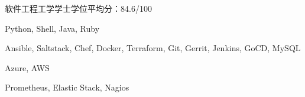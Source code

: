 \documentclass{resume}
\begin{document}
\begin{body}

	\smallskip
	{软件工程工学学士学位}{平均分：84.6/100}
\end{body}

\smallskip


\begin{body}
\begin{description}[style=nextline,leftmargin=8em,topsep=1pt]
	\item[语言] Python, Shell, Java, Ruby
	\item[工具] Ansible, Saltstack, Chef, Docker, Terraform, Git, Gerrit, Jenkins, GoCD, MySQL
	\item[云服务] Azure, AWS
	\item[监控] Prometheus, Elastic Stack, Nagios
\end{description}
\end{body}





%
\end{document}
